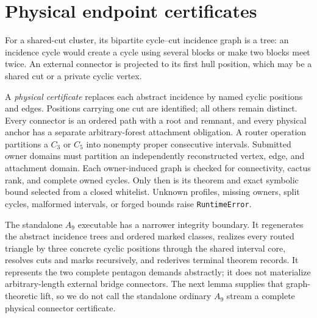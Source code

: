 \documentclass[11pt]{article}
\theoremstyle{remark}
\begin{document}
\section{Physical endpoint certificates}

For a shared-cut cluster, its bipartite cycle--cut incidence graph is a tree:
an incidence cycle would create a cycle using several blocks or make two blocks
meet twice.  An external connector is projected to its first hull position,
which may be a shared cut or a private cyclic vertex.

A \emph{physical certificate} replaces each abstract incidence by named cyclic
positions and edges.  Positions carrying one cut are identified; all others
remain distinct.  Every connector is an ordered path with a root and remnant,
and every physical anchor has a separate arbitrary-forest attachment
obligation.  A router operation partitions a $C_3$ or $C_5$ into nonempty
proper consecutive intervals.  Submitted owner domains must partition an
independently reconstructed vertex, edge, and attachment domain.  Each
owner-induced graph is checked for connectivity, cactus rank, and complete
owned cycles.  Only then is its theorem and exact symbolic bound selected from
a closed whitelist.  Unknown profiles, missing owners, split cycles, malformed
intervals, or forged bounds raise \texttt{RuntimeError}.

The standalone $A_9$ executable has a narrower integrity boundary.  It
regenerates the abstract incidence trees and ordered marked classes, realizes
every routed triangle by three concrete cyclic positions through the shared
interval core, resolves cuts and marks recursively, and rederives terminal
theorem records.  It represents the two complete pentagon demands abstractly;
it does not materialize arbitrary-length external bridge connectors.  The next
lemma supplies that graph-theoretic lift, so we do not call the standalone
ordinary $A_9$ stream a complete physical connector certificate.
\end{document}
